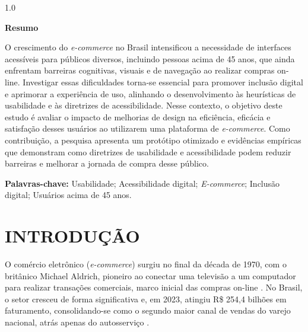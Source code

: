 \documentclass[12pt,a4paper]{article}
\begin{document}
\begin{spacing}{1.0}
\begin{center}
\textbf{Resumo}
\end{center}
\noindent O crescimento do \textit{e-commerce} no Brasil intensificou a necessidade de interfaces acessíveis para públicos diversos, incluindo pessoas acima de 45 anos, que ainda enfrentam barreiras cognitivas, visuais e de navegação ao realizar compras on-line. Investigar essas dificuldades torna-se essencial para promover inclusão digital e aprimorar a experiência de uso, alinhando o desenvolvimento às heurísticas de usabilidade e às diretrizes de acessibilidade. Nesse contexto, o objetivo deste estudo é avaliar o impacto de melhorias de design na eficiência, eficácia e satisfação desses usuários ao utilizarem uma plataforma de \textit{e-commerce}. Como contribuição, a pesquisa apresenta um protótipo otimizado e evidências empíricas que demonstram como diretrizes de usabilidade e acessibilidade podem reduzir barreiras e melhorar a jornada de compra desse público.

\noindent\textbf{Palavras-chave:} Usabilidade; Acessibilidade digital; \textit{E-commerce}; Inclusão digital; Usuários acima de 45 anos.
\end{spacing}

\vspace{0.6cm}

\section{INTRODUÇÃO}

O comércio eletrônico (\textit{e-commerce}) surgiu no final da década de 1970, com o britânico Michael Aldrich, pioneiro ao conectar uma televisão a um computador para realizar transações comerciais, marco inicial das compras on-line \cite{telegraph2014}. No Brasil, o setor cresceu de forma significativa e, em 2023, atingiu R\$ 254,4 bilhões em faturamento, consolidando-se como o segundo maior canal de vendas do varejo nacional, atrás apenas do autosserviço \cite{nielseniq2024}.
\end{document}
